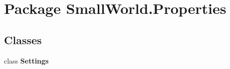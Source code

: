 \hypertarget{namespace_small_world_1_1_properties}{\section{Package Small\-World.\-Properties}
\label{namespace_small_world_1_1_properties}
}
\subsection*{Classes}
\begin{DoxyCompactItemize}
\item 
class {\bfseries Settings}
\end{DoxyCompactItemize}

